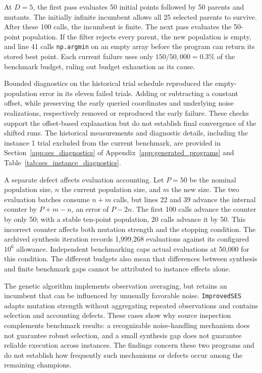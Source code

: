 At $D=5$, the first pass evaluates 50 initial points followed by
50 parents and mutants. The initially infinite incumbent allows
all 25 selected parents to survive. After these 100 calls, the
incumbent is finite. The next pass evaluates the 50-point population.
If the filter rejects every parent, the new population is empty,
and line 41 calls \texttt{np.argmin} on an empty array before the
program can return its stored best point. Each current failure
uses only $150/50{,}000=0.3\%$ of the benchmark budget, ruling out
budget exhaustion as its cause.

Bounded diagnostics on the historical trial schedule reproduced
the empty-population error in its eleven failed trials. Adding
or subtracting a constant offset, while preserving the early
queried coordinates and underlying noise realizations, respectively
removed or reproduced the early failure. These checks support
the offset-based explanation but do not establish final convergence
of the shifted runs. The historical measurements and diagnostic
details, including the instance 1 trial excluded from the current
benchmark, are provided in Section~\ref{app:ses_diagnostics} of
Appendix~\ref{app:generated_programs} and
Table~\ref{tab:ses_instance_diagnostics}.

A separate defect affects evaluation accounting. Let $P=50$ be the
nominal population size, $n$ the current population size, and $m$
the new size. The two evaluation batches consume $n+m$ calls, but
lines 22 and 39 advance the internal counter by $P+m-n$, an error
of $P-2n$. The first 100 calls advance the counter by only 50;
with a stable ten-point population, 20 calls advance it by 50.
This incorrect counter affects both mutation strength and the
stopping condition. The archived synthesis iteration records
1,999,268 evaluations against its configured $10^6$ allowance.
Independent benchmarking caps actual evaluations at 50,000 for
this condition. The different budgets also mean that differences
between synthesis and finite benchmark gaps cannot be attributed
to instance effects alone.

The genetic algorithm implements observation averaging, but retains
an incumbent that can be influenced by unusually favorable noise.
\texttt{ImprovedSES} adapts mutation strength without aggregating
repeated observations and contains selection and accounting defects.
These cases show why source inspection complements benchmark
results: a recognizable noise-handling mechanism does not guarantee
robust selection, and a small synthesis gap does not guarantee
reliable execution across instances. The findings concern these
two programs and do not establish how frequently such mechanisms
or defects occur among the remaining champions.